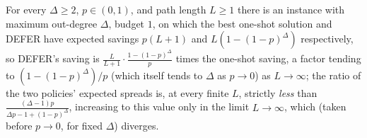 \documentclass[ijoc,sglanonrev]{informs4}
\begin{document}
\begin{repeattheorem}
For every $\Delta\ge 2$, $p\in(0,1)$, and path length $L\ge1$ there is an
instance with maximum out-degree $\Delta$, budget $1$, on which the best
one-shot solution and DEFER have expected savings $p(L+1)$ and
$L(1-(1-p)^\Delta)$ respectively, so DEFER's saving is
$\frac{L}{L+1}\cdot\frac{1-(1-p)^\Delta}{p}$ times the one-shot saving, a
factor tending to $(1-(1-p)^\Delta)/p$ (which itself tends to $\Delta$ as
$p\to0$) as $L\to\infty$; the ratio of the two policies' expected spreads
is, at every finite $L$, strictly \emph{less} than
$\frac{(\Delta-1)p}{\Delta p-1+(1-p)^\Delta}$, increasing to this value only
in the limit $L\to\infty$, which (taken before $p\to0$, for fixed $\Delta$)
diverges.
\end{repeattheorem}
\end{document}
